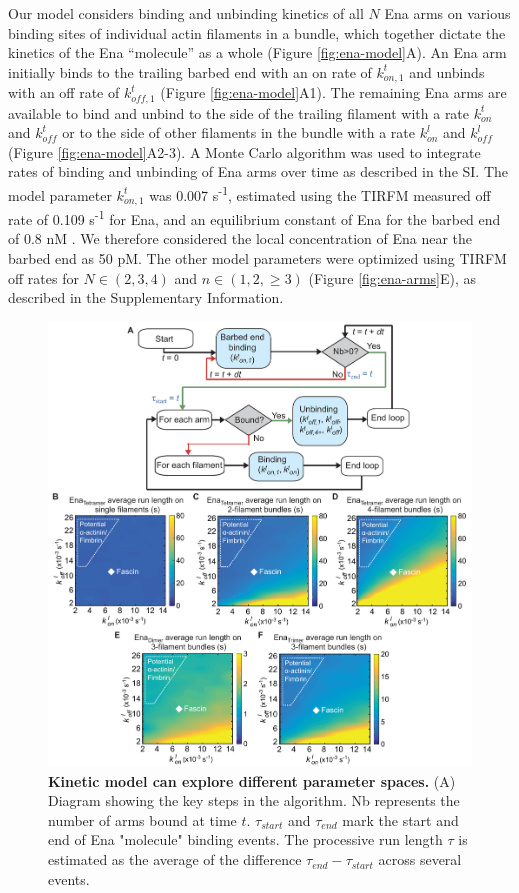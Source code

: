 Our model considers binding and unbinding kinetics of all $N$ Ena arms on various binding sites of individual actin filaments in a bundle, which together dictate the kinetics of the Ena “molecule” as a whole (Figure \ref{fig:ena-model}A). An Ena arm initially binds to the trailing barbed end with an on rate of $k_{on,1}^{t}$ and unbinds with an off rate of $k_{off,1}^t$ (Figure \ref{fig:ena-model}A1). The remaining Ena arms are available to bind and unbind to the side of the trailing filament with a rate $k_{on}^{t}$ and $k_{off}^{t}$ or to the side of other filaments in the bundle with a rate $k_{on}^{l}$ and $k_{off}^{l}$ (Figure \ref{fig:ena-model}A2-3). A Monte Carlo algorithm was used to integrate rates of binding and unbinding of Ena arms over time as described in the SI. The model parameter $k_{on,1}^{t}$ was 0.007 s\textsuperscript{-1}, estimated using the TIRFM measured off rate of 0.109 s\textsuperscript{-1} for Ena, and an equilibrium constant of Ena for the barbed end of 0.8 nM \citep{winkelman_ena/vasp_2014}. We therefore considered the local concentration of Ena near the barbed end as 50 pM. The other model parameters were optimized using TIRFM off rates for $N\in(2,3,4)$ and $n\in(1,2,\geq3)$ (Figure \ref{fig:ena-arms}E), as described in the Supplementary Information. 

\begin{figure}
\centering
\includegraphics[width=\textwidth]{img/ch02/Supp_Figure_4_PNAS.pdf}
\caption[Kinetic model can explore different parameter spaces.]{\textbf{Kinetic model can explore different parameter spaces.} (A) Diagram showing the key steps in the algorithm. Nb represents the number of arms bound at time $t$. $\tau_{start}$ and $\tau_{end}$ mark the start and end of Ena "molecule" binding events. The processive run length $\tau$ is estimated as the average of the difference $\tau_{end} - \tau_{start}$ across several events. }
\label{fig:ena-si-model}
\end{figure}

